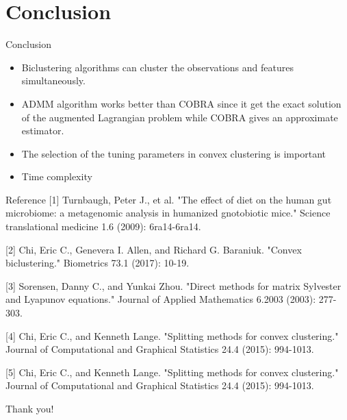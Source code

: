\documentclass{beamer}
\begin{document}
\section{Conclusion}

\begin{frame}{Conclusion}
    
    \begin{itemize}
        \item Biclustering algorithms can cluster the observations and features simultaneously.
        \item ADMM algorithm works better than COBRA since it get the exact solution of the augmented Lagrangian problem while COBRA gives an approximate estimator.
        \item The selection of the tuning parameters in convex clustering is important 
        \item Time complexity
    \end{itemize}
\end{frame}

\begin{frame}{Reference}
    [1] Turnbaugh, Peter J., et al. "The effect of diet on the human gut microbiome: a metagenomic analysis in humanized gnotobiotic mice." Science translational medicine 1.6 (2009): 6ra14-6ra14.
    
    [2] Chi, Eric C., Genevera I. Allen, and Richard G. Baraniuk. "Convex biclustering." Biometrics 73.1 (2017): 10-19.
    
    [3] Sorensen, Danny C., and Yunkai Zhou. "Direct methods for matrix Sylvester and Lyapunov equations." Journal of Applied Mathematics 6.2003 (2003): 277-303.
    
    [4] Chi, Eric C., and Kenneth Lange. "Splitting methods for convex clustering." Journal of Computational and Graphical Statistics 24.4 (2015): 994-1013.
    
    [5] Chi, Eric C., and Kenneth Lange. "Splitting methods for convex clustering." Journal of Computational and Graphical Statistics 24.4 (2015): 994-1013.

\end{frame}


\begin{frame}
\centering
Thank you!

\end{frame}
\end{document}
